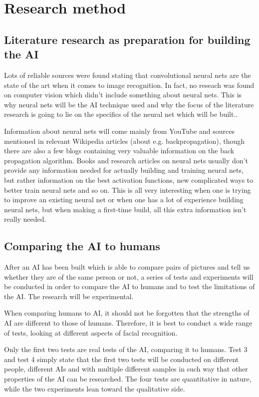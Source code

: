 \documentclass[12pt, titlepage]{article}
\let\oldsection\section
\renewcommand\section{\clearpage\oldsection}
\begin{document}
		\section{Research method}
		
		\subsection{Literature research as preparation for building the AI}
		Lots of reliable sources were found stating that convolutional neural nets are the state of the art when it comes to image recognition\cite{gu}\cite{imageRecognition17}. In fact, no reseach was found on computer vision which didn't include something about neural nets. This is why neural nets will be the AI technique used and why the focus of the literature research is going to lie on the specifics of the neural net which will be built..
		
		\bigskip
		Information about neural nets will come mainly from YouTube and sources mentioned in relevant Wikipedia articles (about e.g. backpropagation), though there are also a few blogs containing very valuable information on the back propagation algorithm. Books and research articles on neural nets usually don't provide any information needed for actually building and training neural nets, but rather information on the best activation functions, new complicated ways to better train neural nets and so on. This is all very interesting when one is trying to improve an existing neural net or when one has a lot of experience building neural nets, but when making a first-time build, all this extra information isn't really needed.
		
		\subsection{Comparing the AI to humans}
		After an AI has been built which is able to compare pairs of pictures and tell us whether they are of the same person or not, a series of tests and experiments will be conducted in order to compare the AI to humans and to test the limitations of the AI. The research will be experimental.
		
		When comparing humans to AI, it should not be forgotten that the strengths of AI are different to those of humans. Therefore, it is best to conduct a wide range of tests, looking at different aspects of facial recognition.
		
		Only the first two tests are real tests of the AI, comparing it to humans. Test 3 and test 4 simply state that the first two tests will be conducted on different people, different AIs and with multiple different samples in such way that other properties of the AI can be researched. The four tests are quantitative in nature, while the two experiments lean toward the qualitative side.
		
\end{document}
